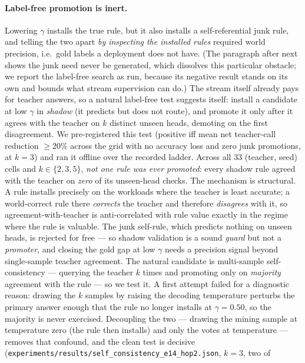 \documentclass[11pt]{article}
\theoremstyle{plain}
\begin{document}
\paragraph{Label-free promotion is inert.} Lowering $\gamma$ installs the true
rule, but it also installs a self-referential junk rule, and telling the two
apart \emph{by inspecting the installed rules} required world precision, i.e.\
gold labels a deployment does not have. (The paragraph after next shows the junk
need never be generated, which dissolves this particular obstacle; we report the
label-free search as run, because its negative result stands on its own and
bounds what stream supervision can do.) The stream itself already pays for
teacher answers, so a natural
label-free test suggests itself: install a candidate at low $\gamma$ in
\emph{shadow} (it predicts but does not route), and promote it only after it
agrees with the teacher on $k$ distinct unseen heads, demoting on the first
disagreement. We pre-registered this test (positive iff mean net teacher-call
reduction ${\ge}20\%$ across the grid with no accuracy loss and zero junk
promotions, at $k{=}3$) and ran it offline over the recorded ladder. Across all
$33$ (teacher, seed) cells and
$k\in\{2,3,5\}$, \emph{not one rule was ever promoted}:
every shadow rule agreed with the teacher on \emph{zero} of its unseen-head
checks. The mechanism is structural. A rule installs precisely on the workloads
where the teacher is least accurate; a world-correct rule there \emph{corrects}
the teacher and therefore \emph{disagrees} with it, so agreement-with-teacher is
anti-correlated with rule value exactly in the regime where the rule is valuable.
The junk self-rule, which predicts nothing on unseen heads, is rejected for free
--- so shadow validation is a sound \emph{guard} but not a \emph{promoter}, and
closing the gold gap at low $\gamma$ needs a precision signal beyond single-sample
teacher agreement. The natural candidate is multi-sample self-consistency ---
querying the teacher $k$ times and promoting only on \emph{majority} agreement
with the rule --- so we test it. A first attempt failed for a diagnostic reason:
drawing the $k$ samples by raising the decoding temperature perturbs the primary
answer enough that the rule no longer installs at $\gamma{=}0.50$, so the majority
is never exercised. Decoupling the two --- drawing the mining sample at
temperature zero (the rule then installs) and only the votes at temperature ---
removes that confound, and the clean test is decisive
(\texttt{experiments/results/self\_consistency\_e14\_hop2.json}, $k{=}3$, two of
\end{document}
